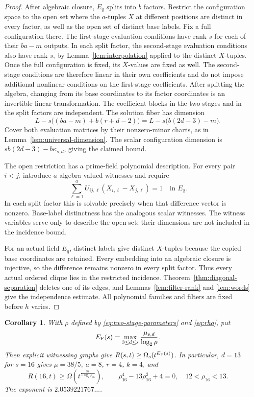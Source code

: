 \documentclass[11pt,a4paper]{article}
\newtheorem{corollary}[theorem]{Corollary}
\theoremstyle{definition}
\theoremstyle{remark}
\numberwithin{equation}{section}
\begin{document}
\begin{proof}
After algebraic closure, $E_q$ splits into $b$ factors. Restrict the configuration space to the open set where the $a$-tuples $X$ at different positions are distinct in every factor, as well as the open set of distinct base labels. Fix a full configuration there. The first-stage evaluation conditions have rank $s$ for each of their $ba-m$ outputs. In each split factor, the second-stage evaluation conditions also have rank $s$, by Lemma~\ref{lem:interpolation} applied to the distinct $X$-tuples. Once the full configuration is fixed, its $X$-values are fixed as well. The second-stage conditions are therefore linear in their own coefficients and do not impose additional nonlinear conditions on the first-stage coefficients. After splitting the algebra, changing from its base coordinates to its factor coordinates is an invertible linear transformation. The coefficient blocks in the two stages and in the split factors are independent. The solution fiber has dimension
\[
L-s\bigl((ba-m)+b(r+d-2)\bigr)=L-s\bigl(b(2d-3)-m\bigr).
\]
Cover both evaluation matrices by their nonzero-minor charts, as in Lemma~\ref{lem:universal-dimension}. The scalar configuration dimension is $s b(2d-3)-b\kappa_{s,d}$, giving the claimed bound.

The open restriction has a prime-field polynomial description. For every pair $i<j$, introduce $a$ algebra-valued witnesses and require
\[
\sum_{\ell=1}^a U_{ij,\ell}(X_{i,\ell}-X_{j,\ell})=1\quad\text{in }E_q.
\]
In each split factor this is solvable precisely when that difference vector is nonzero. Base-label distinctness has the analogous scalar witnesses. The witness variables serve only to describe the open set; their dimensions are not included in the incidence bound.

For an actual field $E_q$, distinct labels give distinct $X$-tuples because the copied base coordinates are retained. Every embedding into an algebraic closure is injective, so the difference remains nonzero in every split factor. Thus every actual ordered clique lies in the restricted incidence. Theorem~\ref{thm:diagonal-separation} deletes one of its edges, and Lemmas~\ref{lem:filter-rank} and \ref{lem:words} give the independence estimate. All polynomial families and filters are fixed before $h$ varies.
\end{proof}


\begin{corollary}\label{cor:frobenius-exponent}
With $\rho$ defined by \eqref{eq:two-stage-parameters} and \eqref{eq:rho}, put
\begin{equation}\label{eq:EF}
E_{\rm F}(s)=\max_{3\le d\le s}\frac{\mu_{s,d}}{\log_2\rho}.
\end{equation}
Then explicit witnessing graphs give $R(s,t)\ge\Omega_s(t^{E_{\rm F}(s)})$. In particular, $d=13$ for $s=16$ gives $\mu=38/5$, $a=8$, $r=4$, $k=4$, and
\begin{equation}\label{eq:R16}
R(16,t)\ge\Omega\left(t^{\frac{38}{5\log_2\rho_{16}}}\right),\qquad
\rho_{16}^4-13\rho_{16}^3+4=0,\quad 12<\rho_{16}<13.
\end{equation}
The exponent is $2.0539221767\ldots$.
\end{corollary}
\end{document}
